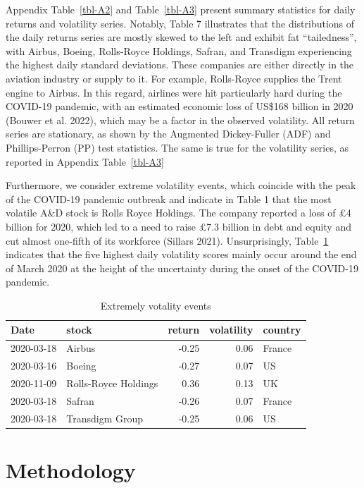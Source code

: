 \documentclass[
  letterpaper,
  DIV=11,
  numbers=noendperiod]{scrartcl}
\begin{document}
Appendix Table~\ref{tbl-A2} and Table~\ref{tbl-A3} present summary
statistics for daily returns and volatility series. Notably, Table 7
illustrates that the distributions of the daily returns series are
mostly skewed to the left and exhibit fat ``tailedness'', with Airbus,
Boeing, Rolls-Royce Holdings, Safran, and Transdigm experiencing the
highest daily standard deviations. These companies are either directly
in the aviation industry or supply to it. For example, Rolls-Royce
supplies the Trent engine to Airbus. In this regard, airlines were hit
particularly hard during the COVID-19 pandemic, with an estimated
economic loss of US\$168 billion in 2020 (Bouwer et al. 2022), which may
be a factor in the observed volatility. All return series are
stationary, as shown by the Augmented Dickey-Fuller (ADF) and
Phillips-Perron (PP) test statistics. The same is true for the
volatility series, as reported in Appendix Table~\ref{tbl-A3}

Furthermore, we consider extreme volatility events, which coincide with
the peak of the COVID-19 pandemic outbreak and indicate in Table 1 that
the most volatile A\&D stock is Rolls Royce Holdings. The company
reported a loss of £4 billion for 2020, which led to a need to raise
£7.3 billion in debt and equity and cut almost one-fifth of its
workforce (Sillars 2021). Unsurprisingly, Table~\ref{tbl-Xtremes}
indicates that the five highest daily volatility scores mainly occur
around the end of March 2020 at the height of the uncertainty during the
onset of the COVID-19 pandemic.

\hypertarget{tbl-Xtremes}{}
\begin{table}[H]
\caption{\label{tbl-Xtremes}Extremely votality events }\tabularnewline

\centering
\begin{tabular}[t]{llrrl}
\toprule
Date & stock & return & volatility & country\\
\midrule
2020-03-18 & Airbus & -0.25 & 0.06 & France\\
2020-03-16 & Boeing & -0.27 & 0.07 & US\\
2020-11-09 & Rolls-Royce Holdings & 0.36 & 0.13 & UK\\
2020-03-18 & Safran & -0.26 & 0.07 & France\\
2020-03-18 & Transdigm Group & -0.25 & 0.06 & US\\
\bottomrule
\end{tabular}
\end{table}

\hypertarget{methodology}{%
\section{Methodology}\label{methodology}}
\end{document}
